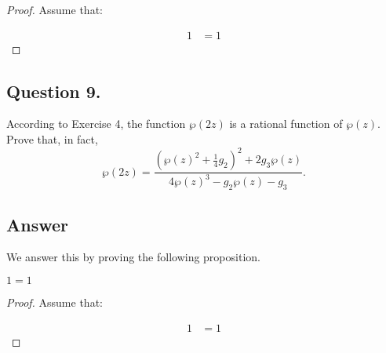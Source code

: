\begin{proof}
    Assume that:

    \begin{align*}
        1 &= 1
    \end{align*}

\end{proof}


\subsection{Question 9.}
\noindent
According to Exercise 4, the function $\wp(2z)$ is a rational function of $\wp(z)$. Prove that, in fact,
\[
    \wp(2z) = \frac{(\wp(z)^2 + \frac{1}{4}g_2)^2+2g_3\wp(z)}{4\wp(z)^3-g_2\wp(z)-g_3}.
\]

\subsection*{Answer}
\noindent
We answer this by proving the following proposition.

\begin{proposition}
    $1=1$
\end{proposition}

\begin{proof}
    Assume that:

    \begin{align*}
        1 &= 1
    \end{align*}

\end{proof}
